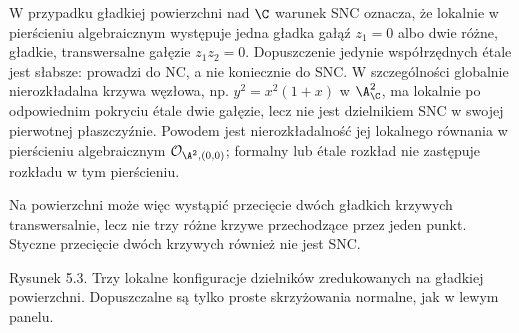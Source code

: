 W przypadku gładkiej powierzchni nad $\C$ warunek SNC
oznacza, że lokalnie w pierścieniu algebraicznym występuje
jedna gładka gałąź $z_1=0$ albo dwie różne, gładkie,
transwersalne gałęzie $z_1z_2=0$. Dopuszczenie jedynie
współrzędnych étale jest słabsze: prowadzi do NC, a nie
koniecznie do SNC. W szczególności globalnie nierozkładalna
krzywa węzłowa, np. $y^2=x^2(1+x)$ w $\A^2_{\C}$,
ma lokalnie po odpowiednim pokryciu étale dwie gałęzie,
lecz nie jest dzielnikiem SNC w swojej pierwotnej
płaszczyźnie. Powodem jest nierozkładalność jej lokalnego
równania w pierścieniu algebraicznym
$\mathcal O_{\A^2,(0,0)}$; formalny lub étale rozkład
nie zastępuje rozkładu w tym pierścieniu.

Na powierzchni może więc wystąpić przecięcie dwóch
gładkich krzywych transwersalnie, lecz nie trzy różne
krzywe przechodzące przez jeden punkt. Styczne
przecięcie dwóch krzywych również nie jest SNC.

\begin{center}

{\small Rysunek 5.3. Trzy lokalne konfiguracje dzielników zredukowanych na gładkiej powierzchni. Dopuszczalne są tylko proste skrzyżowania normalne, jak w lewym panelu.}\par
\end{center}

